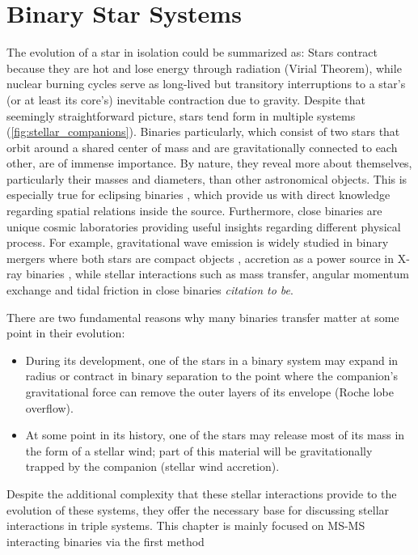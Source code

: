 \chapter{Binary Star Systems}

The evolution of a star in isolation could be summarized as: Stars contract because they are hot and lose energy through radiation (Virial Theorem), while nuclear burning cycles serve as long-lived but transitory interruptions to a star's (or at least its core's) inevitable contraction due to gravity. Despite that seemingly straightforward picture, stars tend form in multiple systems (\cref{fig:stellar_companions}). Binaries particularly, which consist of two stars that orbit around a shared center of mass and are gravitationally connected to each other, are of immense importance. By nature,  they reveal more about themselves, particularly their masses and diameters, than other astronomical objects. This is especially true for eclipsing binaries \citep{prvsa2016physics}, which provide us with direct knowledge regarding spatial relations inside the source. Furthermore, close binaries are unique cosmic laboratories providing useful insights regarding different physical process. For example, gravitational wave emission is widely studied in binary mergers where both stars are compact objects \citep{cutler1994gravitational,abbott2017gw170608,abbott2019gwtc}, accretion as a power source in X-ray binaries \citep{lewin1997x,reig2011x}, while stellar interactions such as mass transfer, angular momentum exchange and tidal friction in close binaries {\it citation to be}. 

There are two fundamental reasons why many binaries transfer matter at some point in their evolution:

\begin{itemize}
    \item During its development, one of the stars in a binary system may expand in radius or contract in binary separation to the point where the companion's gravitational force can remove the outer layers of its envelope (Roche lobe overflow).
    \item At some point in its history, one of the stars may release most of its mass in the form of a stellar wind; part of this material will be gravitationally trapped by the companion (stellar wind accretion).
\end{itemize}

Despite the additional complexity that these stellar interactions provide to the evolution of these systems, they offer the necessary base for discussing stellar interactions in triple systems. This chapter is mainly focused on MS-MS interacting binaries via the first method


